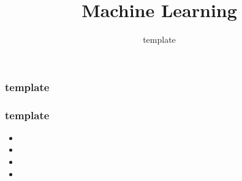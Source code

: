 \documentclass{formation}
\title{Machine Learning}
\subtitle{template}
\begin{document}
\maketitle

\begin{frame}
  \frametitle{template}
\end{frame}

\begin{frame}
  \frametitle{template}
  \begin{minipage}[l]{0.49\linewidth}
  \end{minipage}\hfill
  \begin{minipage}[l]{0.49\linewidth}
    \begin{itemize}
    \item 
    \item 
    \item 
    \item 
    \end{itemize}
  \end{minipage}\hfill
\end{frame}
\end{document}

